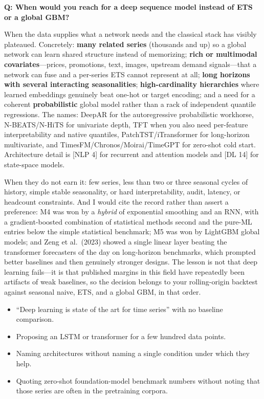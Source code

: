 \begin{interviewq}
\textbf{Q: When would you reach for a deep sequence model instead of ETS or a global GBM?}

 \quad {} \quad \badgefreq{\freqmed}

\stronganswer

When the data supplies what a network needs and the classical stack has visibly plateaued. Concretely: \textbf{many related series} (thousands and up) so a global network can learn shared structure instead of memorizing; \textbf{rich or multimodal covariates}---prices, promotions, text, images, upstream demand signals---that a network can fuse and a per-series ETS cannot represent at all; \textbf{long horizons with several interacting seasonalities}; \textbf{high-cardinality hierarchies} where learned embeddings genuinely beat one-hot or target encoding; and a need for a coherent \textbf{probabilistic} global model rather than a rack of independent quantile regressions. The names: DeepAR for the autoregressive probabilistic workhorse, N-BEATS/N-HiTS for univariate depth, TFT when you also need per-feature interpretability and native quantiles, PatchTST/iTransformer for long-horizon multivariate, and TimesFM/Chronos/Moirai/TimeGPT for zero-shot cold start. Architecture detail is [NLP 4] for recurrent and attention models and [DL 14] for state-space models.

When they do not earn it: few series, less than two or three seasonal cycles of history, simple stable seasonality, or hard interpretability, audit, latency, or headcount constraints. And I would cite the record rather than assert a preference: M4 was won by a \emph{hybrid} of exponential smoothing and an RNN, with a gradient-boosted combination of statistical methods second and the pure-ML entries below the simple statistical benchmark; M5 was won by LightGBM global models; and Zeng et al.\ (2023) showed a single linear layer beating the transformer forecasters of the day on long-horizon benchmarks, which prompted better baselines and then genuinely stronger designs. The lesson is not that deep learning fails---it is that published margins in this field have repeatedly been artifacts of weak baselines, so the decision belongs to your rolling-origin backtest against seasonal naive, ETS, and a global GBM, in that order.

\redflags
\begin{itemize}
    \item ``Deep learning is state of the art for time series'' with no baseline comparison.
    \item Proposing an LSTM or transformer for a few hundred data points.
    \item Naming architectures without naming a single condition under which they help.
    \item Quoting zero-shot foundation-model benchmark numbers without noting that those series are often in the pretraining corpora.
\end{itemize}


\end{interviewq}
